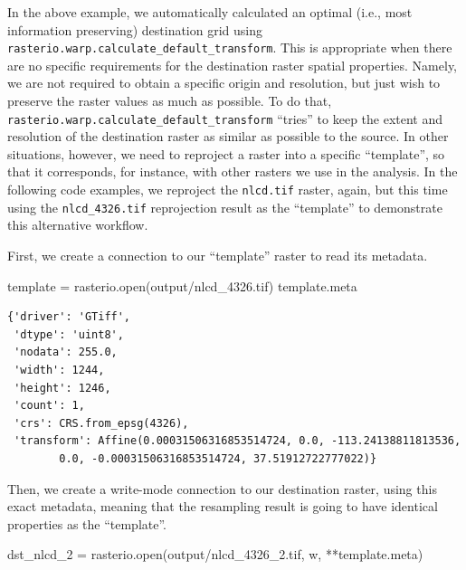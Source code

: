 \documentclass[
  letterpaper,
]{krantz}
\newenvironment{Shaded}{\begin{snugshade}}{\end{snugshade}}
\newcommand{\BuiltInTok}[1]{\textcolor[rgb]{0.00,0.23,0.31}{#1}}
\newcommand{\NormalTok}[1]{\textcolor[rgb]{0.00,0.23,0.31}{#1}}
\newcommand{\OperatorTok}[1]{\textcolor[rgb]{0.37,0.37,0.37}{#1}}
\newcommand{\StringTok}[1]{\textcolor[rgb]{0.13,0.47,0.30}{#1}}
\begin{document}
In the above example, we automatically calculated an optimal (i.e., most
information preserving) destination grid using
\texttt{rasterio.warp.calculate\_default\_transform}. This is
appropriate when there are no specific requirements for the destination
raster spatial properties. Namely, we are not required to obtain a
specific origin and resolution, but just wish to preserve the raster
values as much as possible. To do that,
\texttt{rasterio.warp.calculate\_default\_transform} ``tries'' to keep
the extent and resolution of the destination raster as similar as
possible to the source. In other situations, however, we need to
reproject a raster into a specific ``template'', so that it corresponds,
for instance, with other rasters we use in the analysis. In the
following code examples, we reproject the \texttt{nlcd.tif} raster,
again, but this time using the \texttt{nlcd\_4326.tif} reprojection
result as the ``template'' to demonstrate this alternative workflow.

First, we create a connection to our ``template'' raster to read its
metadata.

\begin{Shaded}
\begin{Highlighting}[]
\NormalTok{template }\OperatorTok{=}\NormalTok{ rasterio.}\BuiltInTok{open}\NormalTok{(}\StringTok{\textquotesingle{}output/nlcd\_4326.tif\textquotesingle{}}\NormalTok{)}
\NormalTok{template.meta}
\end{Highlighting}
\end{Shaded}

\begin{verbatim}
{'driver': 'GTiff',
 'dtype': 'uint8',
 'nodata': 255.0,
 'width': 1244,
 'height': 1246,
 'count': 1,
 'crs': CRS.from_epsg(4326),
 'transform': Affine(0.00031506316853514724, 0.0, -113.24138811813536,
        0.0, -0.00031506316853514724, 37.51912722777022)}
\end{verbatim}

Then, we create a write-mode connection to our destination raster, using
this exact metadata, meaning that the resampling result is going to have
identical properties as the ``template''.

\begin{Shaded}
\begin{Highlighting}[]
\NormalTok{dst\_nlcd\_2 }\OperatorTok{=}\NormalTok{ rasterio.}\BuiltInTok{open}\NormalTok{(}\StringTok{\textquotesingle{}output/nlcd\_4326\_2.tif\textquotesingle{}}\NormalTok{, }\StringTok{\textquotesingle{}w\textquotesingle{}}\NormalTok{, }\OperatorTok{**}\NormalTok{template.meta)}
\end{Highlighting}
\end{Shaded}
\end{document}

